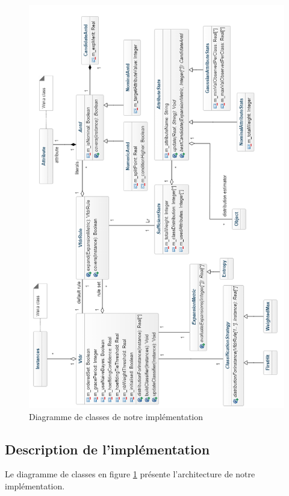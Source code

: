     \begin{figure}

        \includegraphics[width=\textwidth]{SOURCES/image2}
        \caption{Diagramme de classes de notre implémentation}
        \label{fig:dclass}
    \end{figure}


    \subsection{Description de l'implémentation}

        Le diagramme de classes en figure \ref{fig:dclass} présente l'architecture de notre implémentation.

